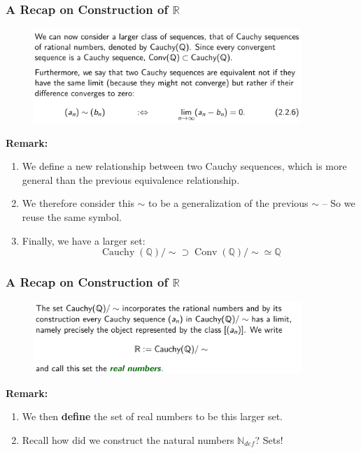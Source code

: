 \documentclass[10pt, t]{beamer}
\newcommand{\N}{\mathbb{N}}
\newcommand{\R}{\mathbb{R}}
\begin{document}
\begin{frame}
    \frametitle{A Recap on Construction of $\R$}
    \begin{figure}[H]
        \centering
        \includegraphics[width=0.9\textwidth]{2020-10-13-21-18-29.png}
    \end{figure}
    \textbf{Remark:}
    \begin{enumerate}
        \item We define a new relationship between two Cauchy sequences, which is more general than the previous equivalence relationship.
        \item We therefore consider this $\sim$ to be a generalization of the previous $\sim$ -- So we reuse the same symbol.
        \item Finally, we have a larger set:
              $$\operatorname{Cauchy}(\mathbb{Q}) / \sim \supset \operatorname{Conv}(\mathbb{Q}) / \sim \simeq \mathbb{Q}$$
    \end{enumerate}
\end{frame}

\begin{frame}
    \frametitle{A Recap on Construction of $\R$}
    \begin{figure}[H]
        \centering
        \includegraphics[width=0.9\textwidth]{2020-10-13-21-23-38.png}
    \end{figure}
    \textbf{Remark:}
    \begin{enumerate}
        \item We then \textbf{define} the set of real numbers to be this larger set.
        \item Recall how did we construct the natural numbers $\N_{def}$? Sets!
    \end{enumerate}
\end{frame}
\end{document}
